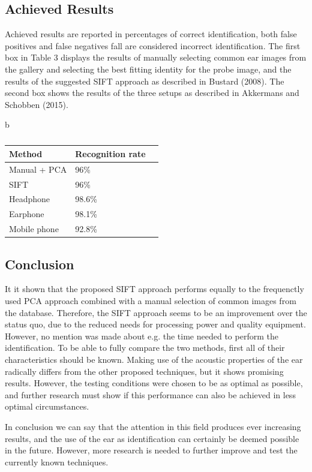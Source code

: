 \documentclass[10pt]{article}
\begin{document}
\subsection{Achieved Results}
Achieved results are reported in percentages of correct identification, both false positives and false negatives fall are considered incorrect identification. 
The first box in Table 3 displays the results of manually selecting common ear images from the gallery and selecting the best fitting identity for the probe image,
and the results of the suggested SIFT approach as described in Bustard (2008).
The second box shows the results of the three setups as described in Akkermans and Schobben (2015).
\begin{table}{b}
	\centering
	\begin{tabular}{|l|l|l|}
		\hline
		\textbf{Method} & \textbf{Recognition rate} \\
		\hline
		Manual + PCA & 96\% \\
		SIFT & 96\% \\
		\hline
		Headphone & 98.6\% \\
		Earphone & 98.1\% \\
		Mobile phone & 92.8\% \\
		\hline
	\end{tabular}
	\caption{}
\end{table}

\subsection{Conclusion}
It it shown that the proposed SIFT approach performs equally to the frequenctly used PCA approach combined with a manual selection of common images from the database.
Therefore, the SIFT approach seems to be an improvement over the status quo, due to the reduced needs for processing power and quality equipment.
However, no mention was made about e.g. the time needed to perform the identification. 
To be able to fully compare the two methods, first all of their characteristics should be known.
Making use of the acoustic properties of the ear radically differs from the other proposed techniques, 
but it shows promising results.
However, the testing conditions were chosen to be as optimal as possible, and further research must show if this performance can also be achieved 
in less optimal circumstances.

In conclusion we can say that the attention in this field produces ever increasing results, 
and the use of the ear as identification can certainly be deemed possible in the future.
However, more research is needed to further improve and test the currently known techniques.


\end{document}
